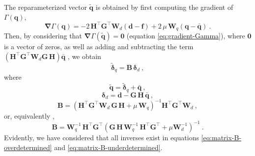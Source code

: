 The reparameterized vector $\tilde{\mathbf{q}}$ is obtained by first computing the gradient of $\Gamma(\mathbf{q})$,
\begin{equation}
	\boldsymbol{\nabla} \Gamma(\mathbf{q}) = 
	-2 \, \mathbf{H}^{\top}\mathbf{G}^{\top} \mathbf{W}_{d} \left(\mathbf{d} - \mathbf{f} \right) +
	2 \, \mu \, \mathbf{W}_{q} \left( \mathbf{q} - \bar{\mathbf{q}} \right) \: .
	\label{eq:gradient-Gamma}
\end{equation}
Then, by considering that $\boldsymbol{\nabla} \Gamma(\tilde{\mathbf{q}}) = \mathbf{0}$ (equation \ref{eq:gradient-Gamma}),
where $\mathbf{0}$ is a vector of zeros, as well as adding and subtracting the term
$\left( \mathbf{H}^{\top}\mathbf{G}^{\top}\mathbf{W}_{d} \mathbf{G} \, \mathbf{H} \right) \bar{\mathbf{q}}$ ,
we obtain
\begin{equation}
	\tilde{\boldsymbol{\delta}}_{q} = \mathbf{B} \, \boldsymbol{\delta}_{d} \: ,
	\label{eq:vector-q-tilde}
\end{equation}
where 
\begin{equation}
	\tilde{\mathbf{q}} = \tilde{\boldsymbol{\delta}}_{q} + \bar{\mathbf{q}} \: ,
	\label{eq:delta-q-tilde}
\end{equation}
\begin{equation}
	\boldsymbol{\delta}_{d} = \mathbf{d} - \mathbf{G} \, \mathbf{H} \, \bar{\mathbf{q}} \: ,
	\label{eq:delta-d}
\end{equation}
\begin{equation}
	\mathbf{B} = \left( \mathbf{H}^{\top} \mathbf{G}^{\top} \mathbf{W}_{d} \, \mathbf{G} \, \mathbf{H} + 
	\mu \, \mathbf{W}_{q} \right)^{-1}
	\mathbf{H}^{\top} \mathbf{G}^{\top} \mathbf{W}_{d} \: ,
	\label{eq:matrix-B-overdetermined}
\end{equation}
or, equivalently \cite[][p. 62]{menke2018},
\begin{equation}
	\mathbf{B} = \mathbf{W}_{q}^{-1} \, \mathbf{H}^{\top} \mathbf{G}^{\top}
	\left( \mathbf{G} \, \mathbf{H} \, \mathbf{W}_{q}^{-1} \,
	\mathbf{H}^{\top}\mathbf{G}^{\top} + \mu \mathbf{W}_{d}^{-1} \right)^{-1} \: .
	\label{eq:matrix-B-underdetermined}
\end{equation}
Evidently, we have considered that all inverses exist in equations \ref{eq:matrix-B-overdetermined} and \ref{eq:matrix-B-underdetermined}.

